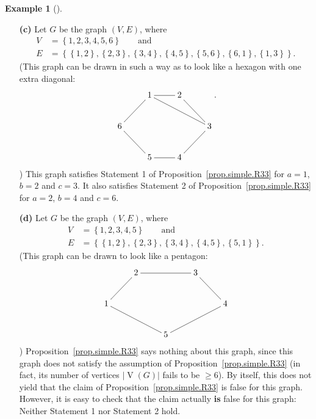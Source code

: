 \documentclass[numbers=enddot,12pt,final,onecolumn,notitlepage]{scrartcl}%
\makeatletter
\theoremstyle{definition}
\newtheorem{exam}[theo]{Example}
\newenvironment{example}[1][]
{\begin{exam}[#1]\begin{leftbar}}
{\end{leftbar}\end{exam}}
\newcommand{\set}[1]{\left\{ #1 \right\}}
\newcommand{\abs}[1]{\left| #1 \right|}
\newcommand{\tup}[1]{\left( #1 \right)}
\newcommand{\verts}[1]{\operatorname{V}\left( #1 \right)}
\newcommand{\are}{\ar@{-}}
\makeatother
\begin{document}
\begin{example}
\begin{enumerate}
\item[\textbf{(c)}] Let $G$ be the graph $\tup{V, E}$, where
\begin{align*}
V &= \set{1, 2, 3, 4, 5, 6} \qquad \text{and} \\
E &= \set{\set{1,2}, \set{2,3}, \set{3,4}, \set{4,5}, \set{5,6},
          \set{6,1}, \set{1,3}} .
\end{align*}
(This graph can be drawn in such a way as to look like a hexagon with
one extra diagonal:
\begin{align*}
\xymatrix{
& 1 \are[r] \are[rrd] & 2 \are[rd] \\
6 \are[ru] & & & 3 \are[ld] \\
& 5 \are[lu] & 4 \are[l]
} .
\end{align*}
)
This graph satisfies Statement 1 of Proposition~\ref{prop.simple.R33}
for $a=1$, $b=2$ and $c=3$. It also satisfies Statement 2 of
Proposition~\ref{prop.simple.R33} for $a=2$, $b=4$ and $c=6$.

\item[\textbf{(d)}] Let $G$ be the graph $\tup{V, E}$, where
\begin{align*}
V &= \set{1, 2, 3, 4, 5} \qquad \text{and} \\
E &= \set{\set{1,2}, \set{2,3}, \set{3,4}, \set{4,5}, \set{5,1}} .
\end{align*}
(This graph can be drawn to look like a pentagon:
\begin{align*}
\xymatrix{
& 2 \are[rr] & & 3 \are[rd] \\
1 \are[ru] \are[rrd] & & & & 4 \are[lld] \\
& & 5
}
\end{align*}
)
Proposition~\ref{prop.simple.R33} says nothing about this graph,
since this graph does not satisfy the assumption of
Proposition~\ref{prop.simple.R33} (in fact, its number of vertices
$\abs{\verts{G}}$ fails to be $\geq 6$).
By itself, this does not yield that the claim of
Proposition~\ref{prop.simple.R33} is false for this graph. However,
it is easy to check that the claim actually \textbf{is} false for this
graph: Neither Statement 1 nor Statement 2 hold.
\end{enumerate}

\end{example}
\end{document}
